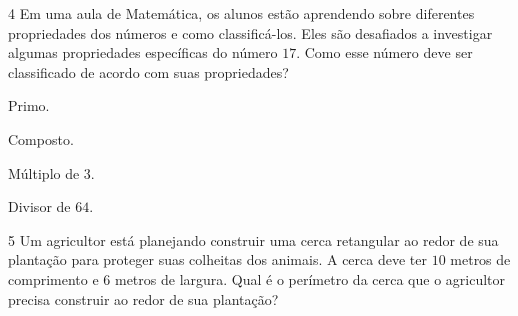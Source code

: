 \num{4} Em uma aula de Matemática, os alunos estão aprendendo sobre diferentes
propriedades dos números e como classificá-los. Eles são desafiados a investigar
algumas propriedades específicas do número $17$. Como esse número deve ser classificado
de acordo com suas propriedades?

\begin{multicols}{2}
\begin{escolha}
\item
  Primo.
\item
  Composto.
\item
  Múltiplo de $3$.
\item
  Divisor de $64$.
\end{escolha}
\end{multicols}




\num{5} Um agricultor está planejando construir uma cerca retangular ao redor
de sua plantação para proteger suas colheitas dos animais. A cerca deve ter
$10$ metros de comprimento e $6$ metros de largura. Qual é o perímetro da cerca
que o agricultor precisa construir ao redor de sua plantação?

